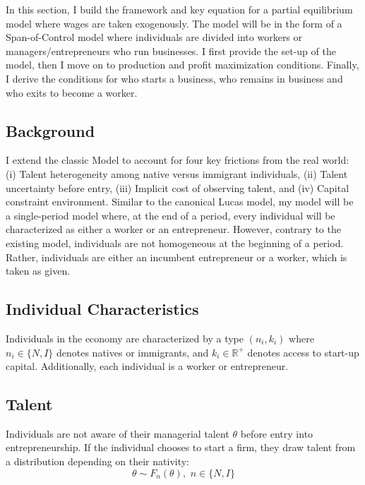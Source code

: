 
    In this section, I build the framework and key equation for a partial equilibrium model where wages are taken exogenously. The model will be in the form of a Span-of-Control model where individuals are divided into workers or managers/entrepreneurs who run businesses. I first provide the set-up of the model, then I move on to production and profit maximization conditions. Finally, I derive the conditions for who starts a business, who remains in business and who exits to become a worker.

\subsection{Background}

    I extend the classic \cite{LucasModel} Model to account for four key frictions from the real world: (i) Talent heterogeneity among native versus immigrant individuals, (ii) Talent uncertainty before entry, (iii) Implicit cost of observing talent, and (iv) Capital constraint environment. Similar to the canonical Lucas model, my model will be a single-period model where, at the end of a period, every individual will be characterized as either a worker or an entrepreneur. However, contrary to the existing model, individuals are not homogeneous at the beginning of a period. Rather, individuals are either an incumbent entrepreneur or a worker, which is taken as given. 

\subsection{Individual Characteristics}

    Individuals in the economy are characterized by a type $(n_i, k_i)$ where $n_i \in \{N, I\}$ denotes natives or immigrants, and $k_i \in \mathbb{R}^+$ denotes access to start-up capital. Additionally, each individual is a worker or entrepreneur. 

\subsection{Talent}

    Individuals are not aware of their managerial talent $\theta$ before entry into entrepreneurship. If the individual chooses to start a firm, they draw talent from a distribution depending on their nativity:
    \begin{equation}
        \theta \sim F_n(\theta), \, \, n \in \{N, I \}
    \end{equation}

